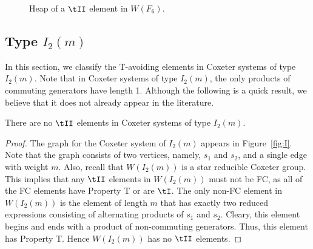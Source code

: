 \begin{figure}[h!]\centering
{}
\caption{Heap of a $\tII$ element in $W(F_6)$.}\label{fig:f6bat}
\end{figure}


\subsection{Type $I_2(m)$}\label{sec:tavoidI}

In this section, we classify the T-avoiding elements in Coxeter systems of type $I_2(m)$. Note that in Coxeter systems of type $I_2(m)$, the only products of commuting generators have length 1. Although the following is a quick result, we believe that it does not already appear in the literature.
\begin{theorem}\label{thm:i2m}
There are no $\tII$ elements in Coxeter systems of type $I_2(m)$.
\begin{proof}
	The graph for the Coxeter system of $I_2(m)$ appears in Figure~\ref{fig:I}. Note that the graph consists of two vertices, namely, $s_1$ and $s_2$, and a single edge with weight $m$. Also, recall that $W(I_2(m))$ is a star reducible Coxeter group. This implies that any $\tII$ elements in $W(I_2(m))$ must not be FC, as all of the FC elements have Property T or are $\tI$. The only non-FC element in $W(I_2(m))$ is the element of length $m$ that has exactly two reduced expressions consisting of alternating products of $s_1$ and $s_2$. Cleary, this element begins and ends with a product of non-commuting generators. Thus, this element has Property T. Hence $W(I_2(m))$ has no $\tII$ elements. 
\end{proof}	
\end{theorem}
 



